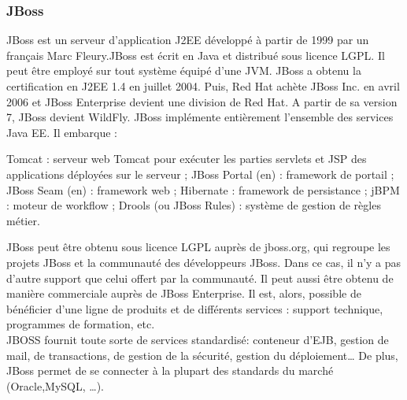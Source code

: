 \subsubsection{JBoss}
JBoss est un serveur d'application J2EE développé à partir de 1999 par un français Marc Fleury.JBoss est écrit en Java et distribué sous licence LGPL. Il peut être employé sur tout système équipé d’une JVM. JBoss a obtenu la certification en J2EE 1.4 en juillet 2004. Puis, Red Hat achète JBoss Inc. en avril 2006 et JBoss Enterprise devient une division de Red Hat. A partir de sa version 7, JBoss devient WildFly. JBoss implémente entièrement l'ensemble des services Java EE. Il embarque :
\begin{itemize}
	\itemcheck Tomcat : serveur web Tomcat pour exécuter les parties servlets et JSP des applications déployées sur le serveur ;
	\itemcheck JBoss Portal (en) : framework de portail ;
	\itemcheck JBoss Seam (en) : framework web ;
	\itemcheck Hibernate : framework de persistance ;
	\itemcheck jBPM : moteur de workflow ;
	\itemcheck Drools (ou JBoss Rules) : système de gestion de règles métier.
\end{itemize}
JBoss peut être obtenu sous licence LGPL auprès de jboss.org, qui regroupe les projets JBoss et la communauté des développeurs JBoss. Dans ce cas, il n’y a pas d’autre support que celui offert par la communauté.
Il peut aussi être obtenu de manière commerciale auprès de JBoss Enterprise. Il est, alors, possible de bénéficier d’une ligne de produits et de différents services : support technique, programmes de formation, etc.\\
JBOSS fournit toute sorte de services standardisé: conteneur d’EJB, gestion de mail, de transactions, de gestion de la sécurité, gestion du déploiement… De plus, JBoss permet de se connecter à la plupart des standards du marché (Oracle,MySQL, …).

